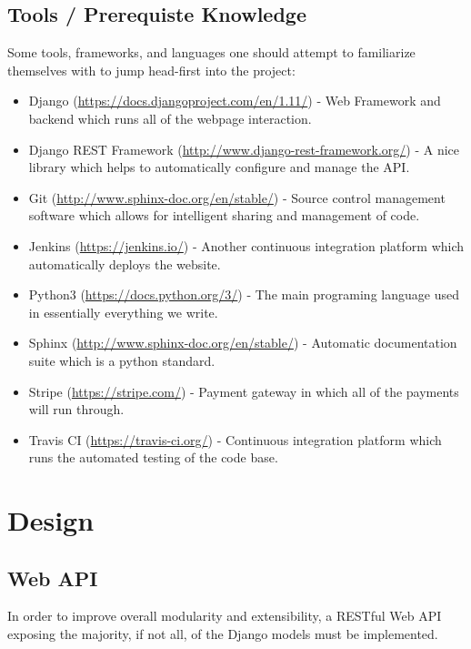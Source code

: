 \documentclass{article}
\begin{document}
\subsection{Tools / Prerequiste Knowledge}
Some tools, frameworks, and languages one should attempt to familiarize 
themselves with to jump head-first into the project:
\begin{itemize}
    \item Django (\url{https://docs.djangoproject.com/en/1.11/}) - Web 
          Framework and backend which runs all of the webpage interaction.
    \item Django REST Framework (\url{http://www.django-rest-framework.org/}) -
          A nice library which helps to automatically configure and manage the
          API.
    \item Git (\url{http://www.sphinx-doc.org/en/stable/}) - Source control
          management software which allows for intelligent sharing and
          management of code.
    \item Jenkins (\url{https://jenkins.io/}) - Another continuous
          integration platform which automatically deploys the website.
    \item Python3 (\url{https://docs.python.org/3/}) - The main programing
          language used in essentially everything we write.
    \item Sphinx (\url{http://www.sphinx-doc.org/en/stable/}) - Automatic
          documentation suite which is a python standard.
    \item Stripe (\url{https://stripe.com/}) - Payment gateway in which all of
          the payments will run through.
    \item Travis CI (\url{https://travis-ci.org/}) - Continuous integration
          platform which runs the automated testing of the code base.
\end{itemize}

\section{Design}
\subsection{Web API}
In order to improve overall modularity and extensibility, a RESTful Web API
exposing the majority, if not all, of the Django models  must be implemented. 
\end{document}
